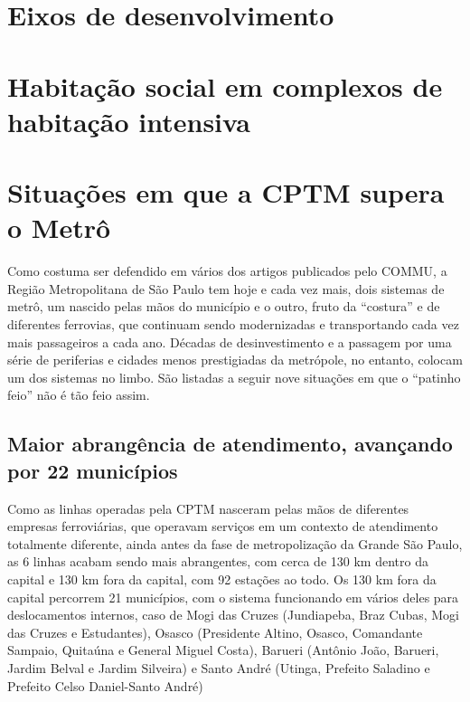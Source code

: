 \documentclass[11pt,fleqn]{book} %
\begin{document}
\lipsum[3-4]

\section{Eixos de desenvolvimento}

\lipsum[3-4]

\section{Habitação social em complexos de habitação intensiva}

\lipsum[3-4]

\section{Situações em que a CPTM supera o Metrô}

Como costuma ser defendido em vários dos artigos publicados pelo COMMU, a Região Metropolitana de São Paulo tem hoje e cada vez mais, dois sistemas de metrô, um nascido pelas mãos do município e o outro, fruto da ``costura'' e de diferentes ferrovias, que continuam sendo modernizadas e transportando cada vez mais passageiros a cada ano. Décadas de desinvestimento e a passagem por uma série de periferias e cidades menos prestigiadas da metrópole, no entanto, colocam um dos sistemas no limbo. São listadas a seguir nove situações em que o ``patinho feio'' não é tão feio assim.

\subsection{Maior abrangência de atendimento, avançando por 22 municípios}

Como as linhas operadas pela CPTM nasceram pelas mãos de diferentes empresas ferroviárias, que operavam serviços em um contexto de atendimento totalmente diferente, ainda antes da fase de metropolização da Grande São Paulo, as 6 linhas acabam sendo mais abrangentes, com cerca de 130 km dentro da capital e 130 km fora da capital, com 92 estações ao todo. Os 130 km fora da capital percorrem 21 municípios, com o sistema funcionando em vários deles para deslocamentos internos, caso de Mogi das Cruzes (Jundiapeba, Braz Cubas, Mogi das Cruzes e Estudantes), Osasco (Presidente Altino, Osasco, Comandante Sampaio, Quitaúna e General Miguel Costa), Barueri (Antônio João, Barueri, Jardim Belval e Jardim Silveira) e Santo André (Utinga, Prefeito Saladino e Prefeito Celso Daniel-Santo André)
\end{document}
